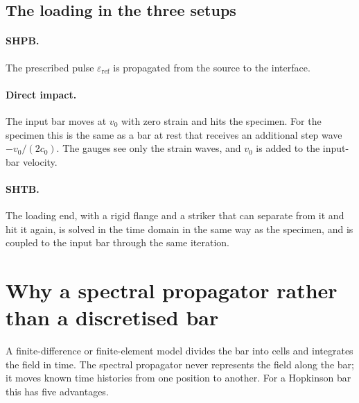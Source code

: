 \documentclass[11pt,a4paper,numbers=noenddot,abstract=true]{scrartcl}
\begin{document}
\subsection{The loading in the three setups}

\paragraph{SHPB.} The prescribed pulse $\varepsilon_\mathrm{ref}$ is propagated from the source to the interface.

\paragraph{Direct impact.} The input bar moves at $v_0$ with zero strain and hits the specimen. For the specimen
this is the same as a bar at rest that receives an additional step wave $-v_0 / (2 c_0)$. The gauges see only the
strain waves, and $v_0$ is added to the input-bar velocity.

\paragraph{SHTB.} The loading end, with a rigid flange and a striker that can separate from it and hit it again,
is solved in the time domain in the same way as the specimen, and is coupled to the input bar through the same
iteration.

\section{Why a spectral propagator rather than a discretised bar}
\label{sec:why}

A finite-difference or finite-element model divides the bar into cells and integrates the field in time. The
spectral propagator never represents the field along the bar; it moves known time histories from one position to
another. For a Hopkinson bar this has five advantages.
\end{document}
